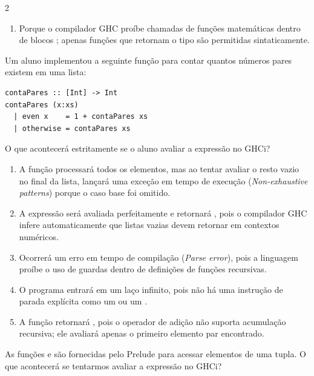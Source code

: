 \documentclass[a4paper,10pt,brazil]{article}
\begin{document}
\begin{multicols}{2}
\begin{enumerate}
  \item Porque o compilador GHC proíbe chamadas de funções matemáticas dentro de blocos ; apenas funções que retornam o tipo  são permitidas sintaticamente.


\end{enumerate}

Um aluno implementou a seguinte função para contar quantos números pares existem em uma lista:

\begin{verbatim}
contaPares :: [Int] -> Int
contaPares (x:xs)
  | even x    = 1 + contaPares xs
  | otherwise = contaPares xs
\end{verbatim}

O que acontecerá estritamente se o aluno avaliar a expressão  no GHCi?

\begin{enumerate}
  \item A função processará todos os elementos, mas ao tentar avaliar o resto vazio no final da lista, lançará uma exceção em tempo de execução (\emph{Non-exhaustive patterns}) porque o caso base  foi omitido.

  \item A expressão será avaliada perfeitamente e retornará , pois o compilador GHC infere automaticamente que listas vazias devem retornar  em contextos numéricos.

  \item Ocorrerá um erro em tempo de compilação (\emph{Parse error}), pois a linguagem proíbe o uso de guardas dentro de definições de funções recursivas.

  \item O programa entrará em um laço infinito, pois não há uma instrução de parada explícita como um  ou um .

  \item A função retornará , pois o operador de adição não suporta acumulação recursiva; ele avaliará apenas o primeiro elemento par encontrado.


\end{enumerate}

As funções  e  são fornecidas pelo Prelude para acessar elementos de uma tupla. O que acontecerá se tentarmos avaliar a expressão  no GHCi?


\end{multicols}
\end{document}
